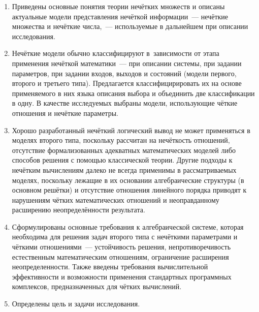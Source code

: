 \begin{enumerate}
  \item Приведены основные понятия теории нечётких множеств и описаны актуальные модели представления нечёткой информации~--- нечёткие множества и нечёткие числа,~--- используемые в дальнейшем при описании исследования.
  \item Нечёткие модели обычно классифицируют в~зависимости от этапа применения нечёткой математики~--- при описании системы, при задании параметров, при задании входов, выходов и состояний (модели первого, второго и третьего типа). Предлагается классифицирировать их на основе применяемого в них языка описания выбора и объединить две классификации в одну. В качестве исследуемых выбраны модели, использующие чёткие отношения и нечёткие параметры.
  \item Хорошо разработанный нечёткий логический вывод не может применяться в моделях второго типа, поскольку рассчитан на нечёткость отношений, отсутствие формализованных адекватных математических моделей либо способов решения с помощью классической теории. Другие подходы к нечётким вычислениям далеко не всегда применимы в рассматриваемых моделях, поскольку лежащие в их основании алгебраические структуры (в основном решётки) и отсутствие отношения линейного порядка приводят к нарушениям чётких математических отношений и неоправданному расширению неопределённости результата.
  \item Сформулированы основные требования к алгебраической системе, которая необходима для решения задач второго типа с нечёткими параметрами и чёткими отношениями~--- устойчивость решения, непротиворечивость естественным математическим отношениям, ограничение расширения неопределенности. Также введены требования вычислительной эффективности и возможности применения стандартных программных комплексов, предназначенных для чётких вычислений.
  \item Определены цель и задачи исследования.
\end{enumerate}
